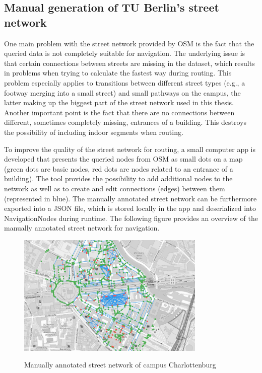 \subsection{Manual generation of TU Berlin's street network} \label{sub_sec:street_network_generation}
One main problem with the street network provided by OSM is the fact that the queried data is not completely suitable for navigation. The underlying issue is that certain connections between streets are missing in the dataset, which results in problems when trying to calculate the fastest way during routing. This problem especially applies to transitions between different street types (e.g., a footway merging into a small street) and small pathways on the campus, the latter making up the biggest part of the street network used in this thesis. Another important point is the fact that there are no connections between different, sometimes completely missing, entrances of a building. This destroys the possibility of including indoor segments when routing.

To improve the quality of the street network for routing, a small computer app is developed that presents the queried nodes from OSM as small dots on a map (green dots are basic nodes, red dots are nodes related to an entrance of a building). The tool provides the possibility to add additional nodes to the network as well as to create and edit connections (edges) between them (represented in blue). The manually annotated street network can be furthermore exported into a JSON file, which is stored locally in the app and deserialized into NavigationNodes during runtime. The following figure provides an overview of the manually annotated street network for navigation.

\begin{figure}[H]
	\centering
	\includegraphics[width=0.8\textwidth]{images/street_network_for_navigation.jpeg}\\
	\caption{Manually annotated street network of campus Charlottenburg}
\end{figure}

